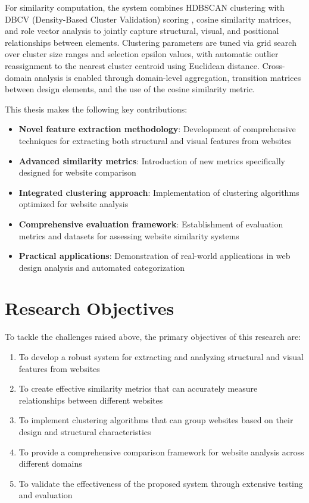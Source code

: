 For similarity computation, the system combines HDBSCAN clustering with DBCV (Density-Based Cluster Validation) scoring \cite{moulavi2014dbcv}, cosine similarity matrices, and role vector analysis to jointly capture structural, visual, and positional relationships between elements. Clustering parameters are tuned via grid search over cluster size ranges and selection epsilon values, with automatic outlier reassignment to the nearest cluster centroid using Euclidean distance. Cross-domain analysis is enabled through domain-level aggregation, transition matrices between design elements, and the use of the cosine similarity metric.

This thesis makes the following key contributions:

\begin{itemize}
    \item \textbf{Novel feature extraction methodology}: Development of comprehensive techniques for extracting both structural and visual features from websites
    \item \textbf{Advanced similarity metrics}: Introduction of new metrics specifically designed for website comparison
    \item \textbf{Integrated clustering approach}: Implementation of clustering algorithms optimized for website analysis
    \item \textbf{Comprehensive evaluation framework}: Establishment of evaluation metrics and datasets for assessing website similarity systems
    \item \textbf{Practical applications}: Demonstration of real-world applications in web design analysis and automated categorization
\end{itemize}

\section{Research Objectives}
\label{sec:objectives}

To tackle the challenges raised above, the primary objectives of this research are:

\begin{enumerate}
    \item To develop a robust system for extracting and analyzing structural and visual features from websites
    \item To create effective similarity metrics that can accurately measure relationships between different websites
    \item To implement clustering algorithms that can group websites based on their design and structural characteristics
    \item To provide a comprehensive comparison framework for website analysis across different domains
    \item To validate the effectiveness of the proposed system through extensive testing and evaluation
\end{enumerate}

